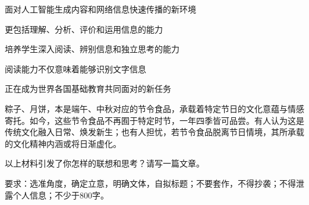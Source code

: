 \documentclass[11pt,a4paper]{ctexart}
\begin{document}
\par\vspace{2.2em}


\par\vspace{2.2em}


面对人工智能生成内容和网络信息快速传播的新环境

更包括理解、分析、评价和运用信息的能力

培养学生深入阅读、辨别信息和独立思考的能力

阅读能力不仅意味着能够识别文字信息

正在成为世界各国基础教育共同面对的新任务

\begin{choices}
\item {}
\item {}
\item {}
\item {}
\end{choices}


\par\vspace{2.2em}



粽子、月饼，本是端午、中秋对应的节令食品，承载着特定节日的文化意蕴与情感寄托。如今，这些节令食品不再囿于特定时节，一年四季皆可品尝。有人认为这是传统文化融入日常、焕发新生；也有人担忧，若节令食品脱离节日情境，其所承载的文化精神内涵或将日渐虚化。

以上材料引发了你怎样的联想和思考？请写一篇文章。

要求：选准角度，确定立意，明确文体，自拟标题；不要套作，不得抄袭；不得泄露个人信息；不少于800字。
\end{document}
